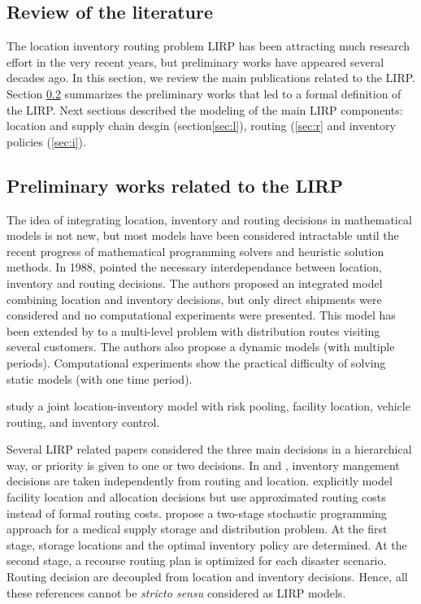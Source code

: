\documentclass[a4paper,10pt]{article}
\begin{document}
\begin{linenumbers}
\subsection{Review of the literature}

The location inventory routing problem LIRP has been attracting much research effort in the very recent years, but preliminary works have appeared several decades ago.  
In this section, we review the main publications related to the LIRP.
Section \ref{sec:almost} summarizes the preliminary works that led to a formal definition of the LIRP. 
Next sections described the modeling of the main LIRP components: location and supply chain desgin (section\ref{sec:l}), 
routing (\ref{sec:r} and inventory policies (\ref{sec:i}). 

\subsection{Preliminary works related to the LIRP}
\label{sec:almost}

 The idea of integrating location, inventory and routing decisions in mathematical models is not new, but most models have been considered intractable until the recent progress of mathematical programming solvers and heuristic solution methods. 
In 1988, \cite{PerSir88} pointed the necessary interdependance between location, inventory and routing decisions. 
The authors proposed an integrated model combining location and inventory decisions, but only direct shipments were considered and no computational experiments were presented. 
This model has been extended by \cite{AmbScu05} to a multi-level problem with distribution routes visiting several customers. The authors also propose a dynamic models (with multiple periods). Computational experiments show the practical difficulty of solving static models (with one time period). 

\cite{DasCShen02} study a joint location-inventory model with risk pooling, facility location, vehicle routing, and inventory control.

Several LIRP related papers considered the three main decisions in a hierarchical way, or priority is given to one or two decisions. 
In \cite{LiuLee03} and \cite{LiuLin05}, inventory mangement decisions are taken independently from routing and location. 
\cite{Shen07} explicitly model facility location and allocation decisions but use approximated routing costs instead of formal routing costs. 
\cite{MetZab10} propose a two-stage stochastic programming approach for a medical supply
storage and distribution problem.
At the first stage, storage locations and the optimal inventory policy are determined. 
At the second stage, a recourse routing plan is optimized for each disaster scenario. 
Routing decision are decoupled from location and inventory decisions. 
Hence, all these references cannot be \textit{stricto sensu} considered as LIRP models. 


\end{linenumbers}
\end{document}
